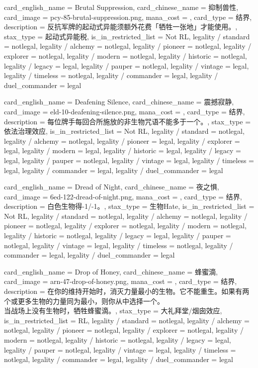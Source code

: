 \documentclass[lang = cn, color = black, 10pt]{AllThatStax}
\begin{document}
\card
{
	card_english_name = {Brutal Suppression},
	card_chinese_name = {抑制兽性},
	card_image = pcy-85-brutal-suppression.png,
	mana_cost = ,
	card_type = 结界,
	description = {反抗军牌的起动式异能须额外花费「牺牲一张地」才能使用。},
	stax_type = 起动式异能税,
	is_in_restricted_list = Not RL,
	legality / standard = notlegal,
	legality / alchemy = notlegal,
	legality / pioneer = notlegal,
	legality / explorer = notlegal,
	legality / modern = notlegal,
	legality / historic = notlegal,
	legality / legacy = legal,
	legality / pauper = notlegal,
	legality / vintage = legal,
	legality / timeless = notlegal,
	legality / commander = legal,
	legality / duel_commander = legal
}

\card
{
	card_english_name = {Deafening Silence},
	card_chinese_name = {震撼寂静},
	card_image = eld-10-deafening-silence.png,
	mana_cost = ,
	card_type = 结界,
	description = {每位牌手每回合所施放的非生物咒语不能多于一个。},
	stax_type = 依法治理效应,
	is_in_restricted_list = Not RL,
	legality / standard = notlegal,
	legality / alchemy = notlegal,
	legality / pioneer = legal,
	legality / explorer = legal,
	legality / modern = legal,
	legality / historic = legal,
	legality / legacy = legal,
	legality / pauper = notlegal,
	legality / vintage = legal,
	legality / timeless = legal,
	legality / commander = legal,
	legality / duel_commander = legal
}

\card
{
	card_english_name = {Dread of Night},
	card_chinese_name = {夜之惧},
	card_image = 6ed-122-dread-of-night.png,
	mana_cost = ,
	card_type = 结界,
	description = {白色生物得-1/-1。},
	stax_type = 生物Hate,
	is_in_restricted_list = Not RL,
	legality / standard = notlegal,
	legality / alchemy = notlegal,
	legality / pioneer = notlegal,
	legality / explorer = notlegal,
	legality / modern = notlegal,
	legality / historic = notlegal,
	legality / legacy = legal,
	legality / pauper = notlegal,
	legality / vintage = legal,
	legality / timeless = notlegal,
	legality / commander = legal,
	legality / duel_commander = legal
}

\card
{
	card_english_name = {Drop of Honey},
	card_chinese_name = {蜂蜜滴},
	card_image = arn-47-drop-of-honey.png,
	mana_cost = ,
	card_type = 结界,
	description = {在你的维持开始时，消灭力量最小的生物。它不能重生。如果有两个或更多生物的力量同为最小，则你从中选择一个。\\
当战场上没有生物时，牺牲蜂蜜滴。},
	stax_type = 大礼拜堂/烟囱效应,
	is_in_restricted_list = RL,
	legality / standard = notlegal,
	legality / alchemy = notlegal,
	legality / pioneer = notlegal,
	legality / explorer = notlegal,
	legality / modern = notlegal,
	legality / historic = notlegal,
	legality / legacy = legal,
	legality / pauper = notlegal,
	legality / vintage = legal,
	legality / timeless = notlegal,
	legality / commander = legal,
	legality / duel_commander = legal
}
\end{document}
